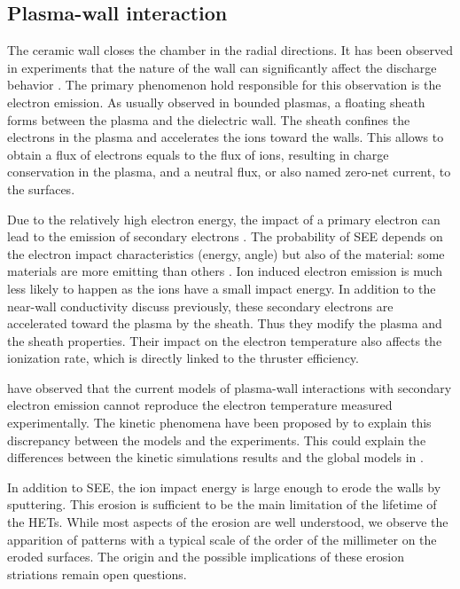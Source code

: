 \subsection*{Plasma-wall interaction}

  The ceramic wall closes the chamber in the radial directions.
  It has been observed in experiments that the nature of the wall can significantly affect the discharge behavior \citep{gascon2003}.
  The primary phenomenon hold responsible for this observation is the electron emission.
  As usually observed in bounded plasmas, a floating sheath forms between the plasma and the dielectric wall.
  The sheath confines the electrons in the plasma and accelerates the ions toward the walls.
  This allows to obtain a flux of electrons equals to the flux of ions, resulting in charge conservation in the plasma, and a neutral flux, or also named zero-net current, to the surfaces.
  
  Due to the relatively high electron energy, the impact of a primary electron can lead to the emission of secondary electrons \citep{barral2003a,villemant2018}.
  The probability of \ac{SEE} depends on the electron impact characteristics (energy, angle) but also of the material\string: some materials are more emitting than others \citep{gascon2003}.
  Ion induced electron emission is much less likely to happen as the ions have a small impact energy.
  In addition to the near-wall conductivity discuss previously, these secondary electrons are accelerated toward the plasma by the sheath.
  Thus they modify the plasma and the sheath properties.
  Their impact on the electron temperature also affects the ionization rate, which is directly linked to the thruster efficiency.
  
  
  \citet{raitses2005} have observed that the current models of plasma-wall interactions with secondary electron emission cannot reproduce the electron temperature measured experimentally.
  The kinetic phenomena have been proposed by \citet{sydorenko2007} to explain this discrepancy between the models and the experiments.
  This could explain the differences between the kinetic simulations results and the global models in \citet{croes2017}.   
    
  \vspace{1em}
  In addition to \ac{SEE}, the ion impact energy is large enough to erode the walls by sputtering.
  This erosion is sufficient to be the main limitation of the lifetime of the \ac{HET}s.
  While most aspects of the erosion are well understood, we observe the apparition of  patterns with a typical scale of the order of the millimeter on the eroded surfaces.
  The origin and the possible implications of these erosion striations remain open questions.
  

